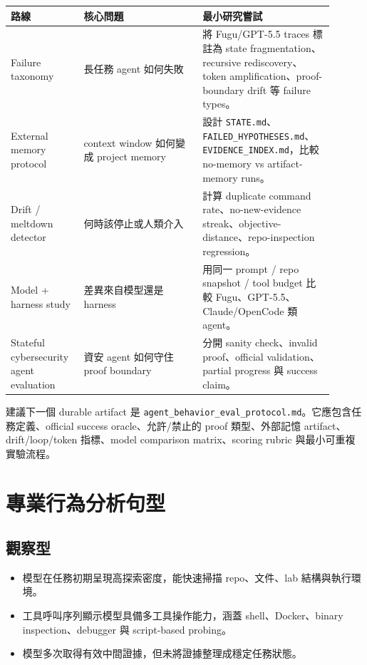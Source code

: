 \documentclass[UTF8,a4paper,11pt]{ctexart}
\newcommand{\artifact}[1]{\texttt{#1}}
\begin{document}
\begin{longtable}{L{0.20\linewidth} L{0.34\linewidth} L{0.36\linewidth}}
\toprule
路線 & 核心問題 & 最小研究嘗試\\
\midrule
Failure taxonomy & 長任務 agent 如何失敗 & 將 Fugu/GPT-5.5 traces 標註為 state fragmentation、recursive rediscovery、token amplification、proof-boundary drift 等 failure types。\\
External memory protocol & context window 如何變成 project memory & 設計 \artifact{STATE.md}、\artifact{FAILED\_HYPOTHESES.md}、\artifact{EVIDENCE\_INDEX.md}，比較 no-memory vs artifact-memory runs。\\
Drift / meltdown detector & 何時該停止或人類介入 & 計算 duplicate command rate、no-new-evidence streak、objective-distance、repo-inspection regression。\\
Model + harness study & 差異來自模型還是 harness & 用同一 prompt / repo snapshot / tool budget 比較 Fugu、GPT-5.5、Claude/OpenCode 類 agent。\\
Stateful cybersecurity agent evaluation & 資安 agent 如何守住 proof boundary & 分開 sanity check、invalid proof、official validation、partial progress 與 success claim。\\
\bottomrule
\end{longtable}

建議下一個 durable artifact 是 \artifact{agent\_behavior\_eval\_protocol.md}。它應包含任務定義、official success oracle、允許/禁止的 proof 類型、外部記憶 artifact、drift/loop/token 指標、model comparison matrix、scoring rubric 與最小可重複實驗流程。

\section{專業行為分析句型}

\subsection{觀察型}

\begin{itemize}
  \item 模型在任務初期呈現高探索密度，能快速掃描 repo、文件、lab 結構與執行環境。
  \item 工具呼叫序列顯示模型具備多工具操作能力，涵蓋 shell、Docker、binary inspection、debugger 與 script-based probing。
  \item 模型多次取得有效中間證據，但未將證據整理成穩定任務狀態。
\end{itemize}
\end{document}
